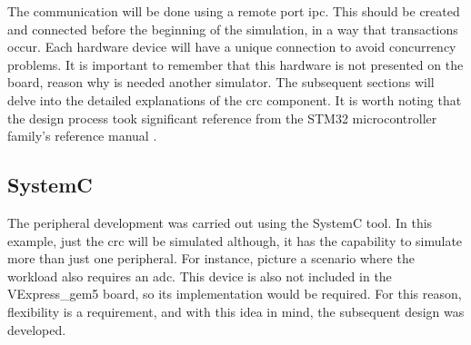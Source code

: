 The communication will be done using a remote port \gls{ipc}. This should be created and connected before the beginning of the
simulation, in a way that transactions occur. Each hardware device will have a unique connection to avoid concurrency problems.
It is important to remember that this hardware is not presented on the board, reason why is needed another simulator. The subsequent sections 
will delve into the detailed explanations of the \gls{crc} component. It is worth noting that the design process 
took significant reference from the STM32 microcontroller family's reference manual \cite{referenceManualRM0385}.


\subsection{SystemC}

The peripheral development was carried out using the SystemC tool. In this example, just the \gls{crc} will be simulated although, it has
the capability to simulate more than just one peripheral. For instance, picture a scenario where the workload also requires an \gls{adc}.
This device is also not included in the VExpress\_gem5 board, so its implementation would be required. For this reason, flexibility
is a requirement, and with this idea in mind, the subsequent design was developed.

